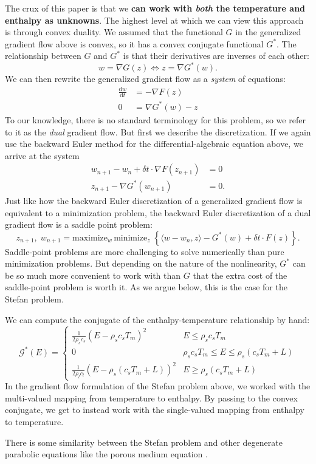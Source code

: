 \documentclass{article}
\theoremstyle{definition}
\theoremstyle{plain}
\begin{document}
The crux of this paper is that we \textbf{can work with \emph{both} the temperature and enthalpy as unknowns}.
The highest level at which we can view this approach is through convex duality.
We assumed that the functional $G$ in the generalized gradient flow above is convex, so it has a convex conjugate functional $G^*$.
The relationship between $G$ and $G^*$ is that their derivatives are inverses of each other:
\begin{equation}
    w = \nabla G(z) \Leftrightarrow z = \nabla G^*(w).
\end{equation}
We can then rewrite the generalized gradient flow as a \emph{system} of equations:
\begin{align}
    \frac{\mathrm dw}{\mathrm dt} & = -\nabla F(z) \\
    0 & = \nabla G^*(w) - z\nonumber
\end{align}
To our knowledge, there is no standard terminology for this problem, so we refer to it as the \emph{dual} gradient flow.
But first we describe the discretization.
If we again use the backward Euler method for the differential-algebraic equation above, we arrive at the system
\begin{align}
    w_{n + 1} - w_n + \delta t\cdot \nabla F(z_{n + 1}) & = 0 \\
    z_{n + 1} - \nabla G^*(w_{n + 1}) & = 0.
\end{align}
Just like how the backward Euler discretization of a generalized gradient flow is equivalent to a minimization problem, the backward Euler discretization of a dual gradient flow is a saddle point problem:
\begin{equation}
    z_{n + 1},\; w_{n + 1} = \text{maximize}_w\,\text{minimize}_z\;\left\{\langle w - w_n, z\rangle - G^*(w) + \delta t\cdot F(z)\right\}.
\end{equation}
Saddle-point problems are more challenging to solve numerically than pure minimization problems.
But depending on the nature of the nonlinearity, $G^*$ can be so much more convenient to work with than $G$ that the extra cost of the saddle-point problem is worth it.
As we argue below, this is the case for the Stefan problem.

We can compute the conjugate of the enthalpy-temperature relationship by hand:
\begin{equation}
    \mathscr G^*(E) = \begin{cases}
        \frac{1}{2\rho_sc_s}(E - \rho_sc_sT_m)^2 & E \le \rho_sc_sT_m \\
        0 & \rho_sc_sT_m \le E \le \rho_s(c_sT_m + L) \\
        \frac{1}{2\rho_lc_l}(E - \rho_s(c_sT_m + L))^2 & E \ge \rho_s(c_sT_m + L)
    \end{cases}
\end{equation}
In the gradient flow formulation of the Stefan problem above, we worked with the multi-valued mapping from temperature to enthalpy.
By passing to the convex conjugate, we get to instead work with the single-valued mapping from enthalpy to temperature.

There is some similarity between the Stefan problem and other degenerate parabolic equations like the porous medium equation \citep{vazquez2006porous}.


\pagebreak



\end{document}
